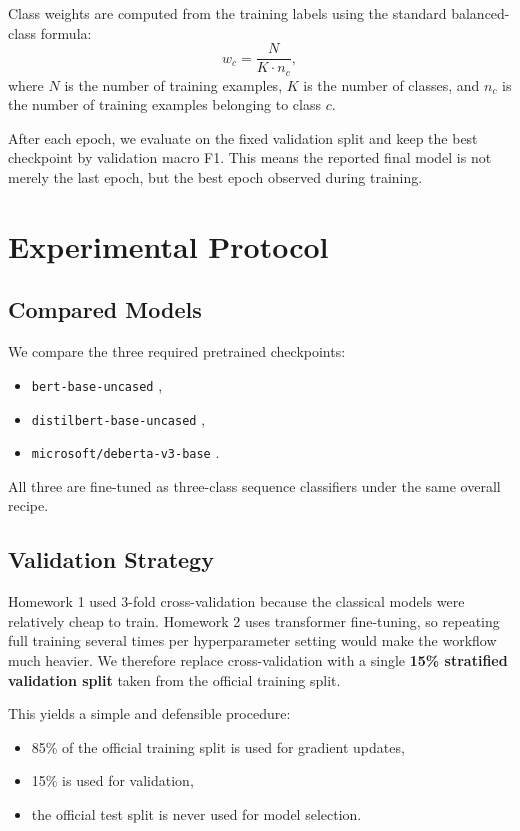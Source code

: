 \documentclass[12pt]{fphw}
\begin{document}
Class weights are computed from the training labels using the standard balanced-class formula:
\[
w_c = \frac{N}{K \cdot n_c},
\]
where $N$ is the number of training examples, $K$ is the number of classes, and $n_c$ is the number of training examples belonging to class $c$.

After each epoch, we evaluate on the fixed validation split and keep the best checkpoint by validation macro F1. This means the reported final model is not merely the last epoch, but the best epoch observed during training.

\section{Experimental Protocol}

\subsection{Compared Models}

We compare the three required pretrained checkpoints:
\begin{itemize}
	\item \texttt{bert-base-uncased} \cite{bert},
	\item \texttt{distilbert-base-uncased} \cite{distilbert},
	\item \texttt{microsoft/deberta-v3-base} \cite{deberta}.
\end{itemize}

All three are fine-tuned as three-class sequence classifiers under the same overall recipe.

\subsection{Validation Strategy}

Homework 1 used 3-fold cross-validation because the classical models were relatively cheap to train. Homework 2 uses transformer fine-tuning, so repeating full training several times per hyperparameter setting would make the workflow much heavier. We therefore replace cross-validation with a single \textbf{15\% stratified validation split} taken from the official training split.

This yields a simple and defensible procedure:
\begin{itemize}
	\item 85\% of the official training split is used for gradient updates,
	\item 15\% is used for validation,
	\item the official test split is never used for model selection.
\end{itemize}
\end{document}

